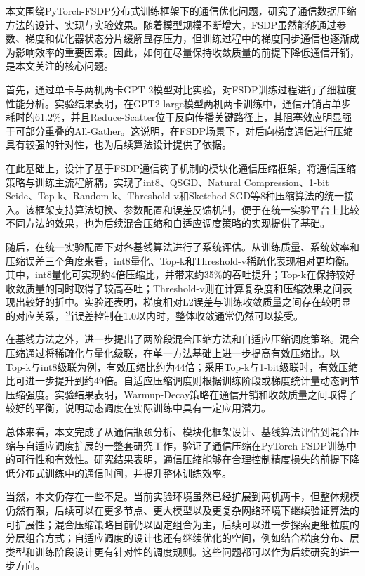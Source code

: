 \begin{conclusions}

本文围绕PyTorch-FSDP分布式训练框架下的通信优化问题，研究了通信数据压缩方法的设计、实现与实验效果。随着模型规模不断增大，FSDP虽然能够通过参数、梯度和优化器状态分片缓解显存压力，但训练过程中的梯度同步通信也逐渐成为影响效率的重要因素。因此，如何在尽量保持收敛质量的前提下降低通信开销，是本文关注的核心问题。

首先，通过单卡与两机两卡GPT-2模型对比实验，对FSDP训练过程进行了细粒度性能分析。实验结果表明，在GPT2-large模型两机两卡训练中，通信开销占单步耗时的61.2\%，并且Reduce-Scatter位于反向传播关键路径上，其阻塞效应明显强于可部分重叠的All-Gather。这说明，在FSDP场景下，对后向梯度通信进行压缩具有较强的针对性，也为后续算法设计提供了依据。

在此基础上，设计了基于FSDP通信钩子机制的模块化通信压缩框架，将通信压缩策略与训练主流程解耦，实现了int8、QSGD、Natural Compression、1-bit Seide、Top-k、Random-k、Threshold-v和Sketched-SGD等8种压缩算法的统一接入。该框架支持算法切换、参数配置和误差反馈机制，便于在统一实验平台上比较不同方法的效果，也为后续混合压缩和自适应调度策略的实现提供了基础。

随后，在统一实验配置下对各基线算法进行了系统评估。从训练质量、系统效率和压缩误差三个角度来看，int8量化、Top-k和Threshold-v稀疏化表现相对更均衡。其中，int8量化可实现约4倍压缩比，并带来约35\%的吞吐提升；Top-k在保持较好收敛质量的同时取得了较高吞吐；Threshold-v则在计算复杂度和压缩效果之间表现出较好的折中。实验还表明，梯度相对L2误差与训练收敛质量之间存在较明显的对应关系，当误差控制在1.0以内时，整体收敛通常仍然可以接受。

在基线方法之外，进一步提出了两阶段混合压缩方法和自适应压缩调度策略。混合压缩通过将稀疏化与量化级联，在单一方法基础上进一步提高有效压缩比。以Top-k与int8级联为例，有效压缩比约为44倍；采用Top-k与1-bit级联时，有效压缩比可进一步提升到约49倍。自适应压缩调度则根据训练阶段或梯度统计量动态调节压缩强度。实验结果表明，Warmup-Decay策略在通信开销和收敛质量之间取得了较好的平衡，说明动态调度在实际训练中具有一定应用潜力。

总体来看，本文完成了从通信瓶颈分析、模块化框架设计、基线算法评估到混合压缩与自适应调度扩展的一整套研究工作，验证了通信压缩在PyTorch-FSDP训练中的可行性和有效性。研究结果表明，通信压缩能够在合理控制精度损失的前提下降低分布式训练中的通信时间，并提升整体训练效率。

当然，本文仍存在一些不足。当前实验环境虽然已经扩展到两机两卡，但整体规模仍然有限，后续可以在更多节点、更大模型以及更复杂网络环境下继续验证算法的可扩展性；混合压缩策略目前仍以固定组合为主，后续可以进一步探索更细粒度的分层组合方式；自适应调度的设计也还有继续优化的空间，例如结合梯度分布、层类型和训练阶段设计更有针对性的调度规则。这些问题都可以作为后续研究的进一步方向。

\end{conclusions}
